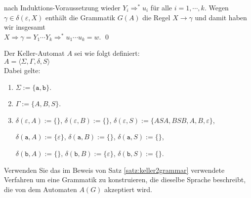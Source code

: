 \begin{enumerate}
\begin{enumerate}
                  nach Induktions-Voraussetzung wieder
                  $Y_i \Rightarrow^* u_i$  f\"ur alle $i = 1, \cdots, k$.
                  Wegen $\gamma \in \delta(\varepsilon,X)$ enth\"alt die Grammatik $G(A)$ die Regel 
                  $X \rightarrow \gamma$ und 
                  damit haben wir insgesamt
                  \\[0.2cm]
                  \hspace*{1.3cm}
                  $X \Rightarrow \gamma = Y_1 \cdots Y_k \Rightarrow^* u_1 \cdots u_k = w$. \qed
            \end{enumerate}
\end{enumerate}

\exercise
Der Keller-Automat $A$ sei wie folgt definiert:
\\[0.2cm]
\hspace*{1.3cm}
$A = \langle \Sigma, \Gamma, \delta, S \rangle$ 
\\[0.2cm] 
Dabei gelte:
\begin{enumerate}
\item $\Sigma := \{ \texttt{a}, \texttt{b} \}$.
\item $\Gamma := \{ A, B, S \}$.
\item $\delta(\varepsilon, A) := \{ \}$, \quad 
      $\delta(\varepsilon, B) := \{ \}$, \quad
      $\delta(\varepsilon, S) := \{ ASA, BSB, A, B, \varepsilon \}$,

      $\delta(\texttt{a}, A) := \{ \varepsilon \}$, \quad
      $\delta(\texttt{a}, B) := \{ \}$, \quad
      $\delta(\texttt{a}, S) := \{ \}$, 

      $\delta(\texttt{b}, A) := \{ \}$, \quad
      $\delta(\texttt{b}, B) := \{ \varepsilon \}$, \quad
      $\delta(\texttt{b}, S) := \{ \}$.
\end{enumerate}
Verwenden Sie das im Beweis von Satz \ref{satz:keller2grammar} verwendete Verfahren um eine
Grammatik zu konstruieren, die dieselbe Sprache beschreibt, die von dem Automaten $A(G)$ akzeptiert
wird.  

